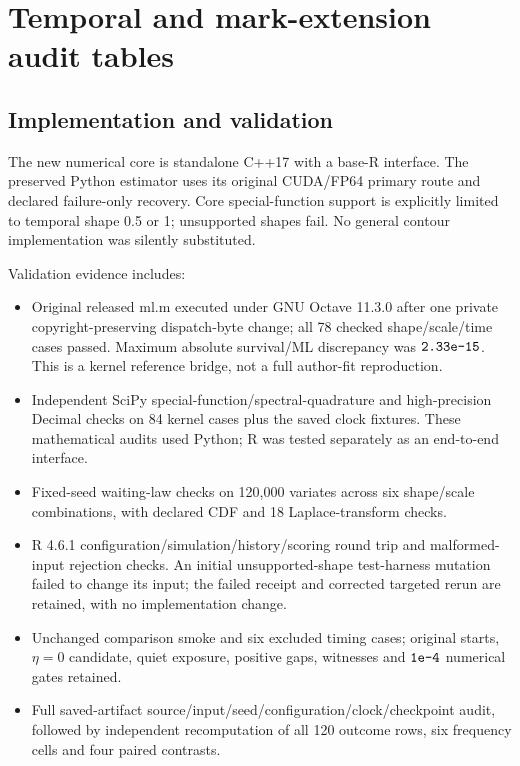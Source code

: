 \section{Temporal and mark-extension audit tables}\label{app:audit09}

\subsection{Implementation and validation}
\label{app:audit09-pilot-implementation}


The new numerical core is standalone C++17 with a base-R interface. The preserved Python estimator uses its original CUDA/FP64 primary route and declared failure-only recovery. Core special-function support is explicitly limited to temporal shape 0.5 or 1; unsupported shapes fail. No general contour implementation was silently substituted.

Validation evidence includes:

\begin{itemize}
\item Original released ml.m executed under GNU Octave 11.3.0 after one private copyright-preserving dispatch-byte change; all 78 checked shape/scale/time cases passed. Maximum absolute survival/ML discrepancy was $\text{\texttt{2.33e-15}}$. This is a kernel reference bridge, not a full author-fit reproduction.
\item Independent SciPy special-function/spectral-quadrature and high-precision Decimal checks on 84 kernel cases plus the saved clock fixtures. These mathematical audits used Python; R was tested separately as an end-to-end interface.
\item Fixed-seed waiting-law checks on 120,000 variates across six shape/scale combinations, with declared CDF and 18 Laplace-transform checks.
\item R 4.6.1 configuration/simulation/history/scoring round trip and malformed-input rejection checks. An initial unsupported-shape test-harness mutation failed to change its input; the failed receipt and corrected targeted rerun are retained, with no implementation change.
\item Unchanged comparison smoke and six excluded timing cases; original starts, $\eta=0$ candidate, quiet exposure, positive gaps, witnesses and $\text{\texttt{1e-4}}$ numerical gates retained.
\item Full saved-artifact source/input/seed/configuration/clock/checkpoint audit, followed by independent recomputation of all 120 outcome rows, six frequency cells and four paired contrasts.
\end{itemize}


